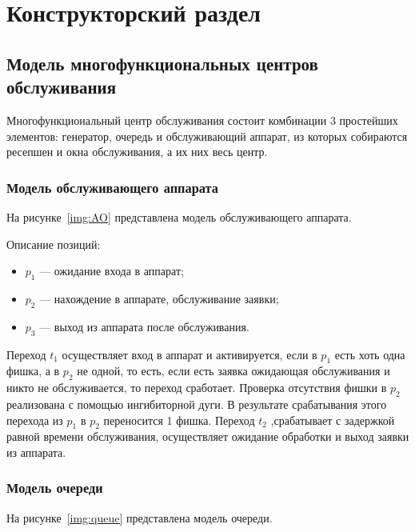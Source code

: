 \chapter{Конструкторский раздел}

\section{Модель многофункциональных центров обслуживания}

Многофункциональный центр обслуживания состоит комбинации 3 простейших элементов: генератор, очередь и обслуживающий аппарат, из которых собираются ресепшен и окна обслуживания, а их них весь центр.


\subsection{Модель обслуживающего аппарата}

На рисунке~\ref{img:AO} представлена модель обслуживающего аппарата.

\FloatBarrier

Описание позиций:
\begin{itemize}[label=---]
	\item $p_1$ --- ожидание входа в аппарат;
	\item $p_2$ --- нахождение в аппарате, обслуживание заявки;
	\item $p_3$ --- выход из аппарата после обслуживания.
\end{itemize}

Переход $t_1$ осуществляет вход в аппарат и активируется, если в $p_1$ есть хоть одна фишка, а в $p_2$ не одной, то есть, если есть заявка ожидающая обслуживания и никто не обслуживается, то переход сработает. Проверка отсутствия фишки в $p_2$ реализована с помощью ингибиторной дуги. В результате срабатывания этого перехода из $p_1$ в $p_2$ переносится 1 фишка. Переход $t_2$ ,срабатывает с задержкой равной времени обслуживания, осуществляет ожидание обработки и выход заявки из аппарата.

\subsection{Модель очереди}

На рисунке~\ref{img:queue} представлена модель очереди.

\FloatBarrier

